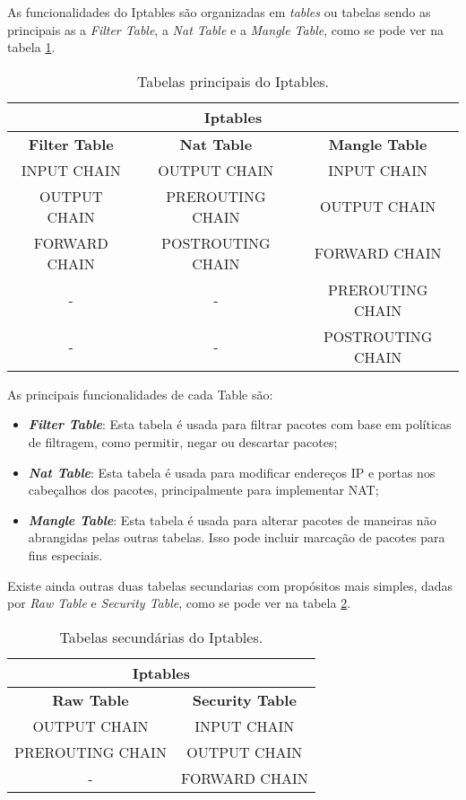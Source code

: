 As funcionalidades do Iptables são organizadas em \textit{tables} ou tabelas
sendo as principais as a \textit{Filter Table}, a \textit{Nat Table} e a
\textit{Mangle Table}, como se pode ver na tabela \ref{ipt1}.

\begin{table}[h]
\centering
\begin{tabular}{|c|c|c|}
\hline
\multicolumn{3}{|c|}{Iptables}\\
\hline
\rowcolor{yellow!50}\textbf{Filter Table} & \textbf{Nat Table} & \textbf{Mangle Table}\\
\hline
INPUT CHAIN & OUTPUT CHAIN & INPUT CHAIN\\
\hline
OUTPUT CHAIN & PREROUTING CHAIN & OUTPUT CHAIN\\
\hline
FORWARD CHAIN & POSTROUTING CHAIN & FORWARD CHAIN\\
\hline
- & - & PREROUTING CHAIN\\
\hline
- & - & POSTROUTING CHAIN\\
\hline
\end{tabular}
\caption{Tabelas principais do Iptables.}
\label{ipt1}
\end{table}


As principais funcionalidades de cada Table são:

\begin{itemize}
\item \textbf{\textit{Filter Table}}: Esta tabela é usada para filtrar pacotes com base em 
políticas de filtragem, como permitir, negar ou descartar pacotes;
\item \textbf{\textit{Nat Table}}: Esta tabela é usada para modificar endereços IP e portas
nos cabeçalhos dos pacotes, principalmente para implementar NAT;
\item \textbf{\textit{Mangle Table}}: Esta tabela é usada para alterar pacotes de maneiras
não abrangidas pelas outras tabelas. Isso pode incluir marcação de pacotes para fins especiais.
\end{itemize}



Existe ainda outras duas tabelas secundarias com propósitos mais simples, dadas 
por \textit{Raw Table} e \textit{Security Table}, como se pode ver na
tabela \ref{ipt2}.


\begin{table}[h]
\centering
\begin{tabular}{|c|c|}
\hline
\multicolumn{2}{|c|}{Iptables}\\
\hline
\rowcolor{yellow!50}\textbf{Raw Table} & \textbf{Security Table}\\
\hline
OUTPUT CHAIN & INPUT CHAIN \\
\hline
PREROUTING CHAIN & OUTPUT CHAIN \\
\hline
- & FORWARD CHAIN \\
\hline
\end{tabular}
\caption{Tabelas secundárias do Iptables.}
\label{ipt2}
\end{table}
    

